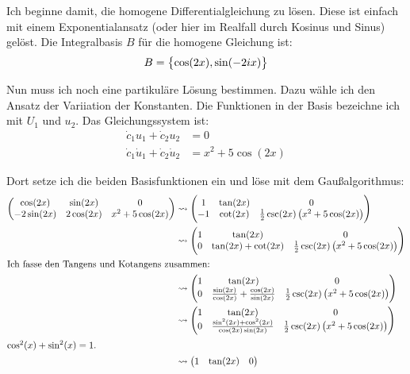 \documentclass[11pt, ngerman]{article}
\begin{document}
Ich beginne damit, die homogene Differentialgleichung zu lösen. Diese ist
einfach mit einem Exponentialansatz (oder hier im Realfall durch Kosinus und
Sinus) gelöst. Die Integralbasis $B$ für die homogene Gleichung ist:
\[
	B = \set{\cos(2x), \sin(-2ix)}
\]

Nun muss ich noch eine partikuläre Lösung bestimmen. Dazu wähle ich den Ansatz
der Variiation der Konstanten. Die Funktionen in der Basis bezeichne ich mit
$U_1$ und $u_2$. Das Gleichungssystem ist:
\begin{align*}
	\dot c_1 u_1 + \dot c_2 u_2 &= 0 \\
	\dot c_1 \dot u_1 + \dot c_2 \dot u_2 &= x^2 + 5 \cos(2x)
\end{align*}

Dort setze ich die beiden Basisfunktionen ein und löse mit dem Gaußalgorithmus:
\begin{align*}
	\begin{pmatrix}
		\cos(2x) & \sin(2x) & 0 \\
		- 2 \sin(2x) & 2 \cos(2x) & x^2 + 5 \cos(2x)
	\end{pmatrix}
	&\leadsto
	\begin{pmatrix}
		1 & \tan(2x) & 0 \\
		-1 & \cot(2x) & \frac 12 \csc(2x) \del{x^2 + 5 \cos(2x)}
	\end{pmatrix} \\
	&\leadsto
	\begin{pmatrix}
		1 & \tan(2x) & 0 \\
		0 & \tan(2x) + \cot(2x) & \frac 12 \csc(2x) \del{x^2 + 5 \cos(2x)}
	\end{pmatrix} \\
	\intertext{Ich fasse den Tangens und Kotangens zusammen:}
	&\leadsto
	\begin{pmatrix}
		1 & \tan(2x) & 0 \\
		0 & \frac{\sin(2x)}{\cos(2x)} + \frac{\cos(2x)}{\sin(2x)} & \frac 12 \csc(2x) \del{x^2 + 5 \cos(2x)}
	\end{pmatrix} \\
	&\leadsto
	\begin{pmatrix}
		1 & \tan(2x) & 0 \\
		0 & \frac{\sin^2(2x) + \cos^2(2x)}{\cos(2x)\sin(2x)} & \frac 12 \csc(2x) \del{x^2 + 5 \cos(2x)}
	\end{pmatrix} \\
	\intertext{$\cos^2(x) + \sin^2(x) = 1$.}
	&\leadsto
	\begin{pmatrix}
		1 & \tan(2x) & 0 \\

\end{pmatrix}
\end{align*}
\end{document}
